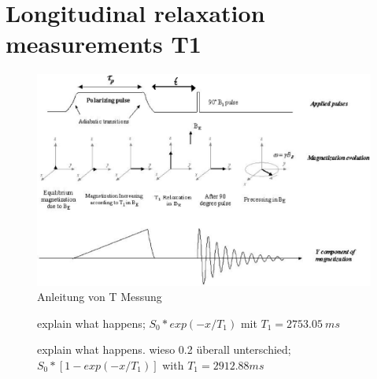 \section{Longitudinal relaxation measurements T1}
\label{sec:LongitudinalrelaxationmeasurementsT1}



\begin{figure}[H]
    \centering
    \includegraphics[width= \textwidth]{BildT1.png}   
    \caption[]{Anleitung von T Messung \cite{Bild}}
    \label{fig:BildT1}
\end{figure}

\begin{figure}[H]
    \centering
    
    \caption[]{explain what happens; $S_0 * exp(-x/T_1)$ mit $T_1=\SI{2753.05}{ms}$}
    \label{fig:T1Erdmagnetfeld}
\end{figure}

\begin{figure}[H]
    \centering
    
    \caption[]{explain what happens. wieso 0.2 überall unterschied; $S_0 *[1-exp(-x/T_1)]$ with $T_1=\si{2912.88}{ms}$}
    \label{fig:T1Polarisationsfeldfeld}
\end{figure}

